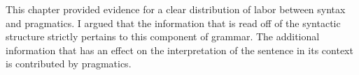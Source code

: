 This chapter provided evidence for a clear distribution of labor between syntax and pragmatics. I argued that the information that is read off  of the syntactic structure strictly pertains to this component of grammar. The additional information that has an effect on the interpretation of the sentence in its context is contributed by pragmatics. 

